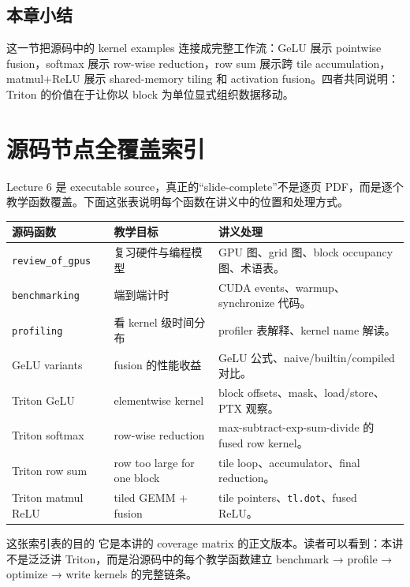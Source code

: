 \documentclass[a4paper]{article}
\begin{document}
\subsection{本章小结}

这一节把源码中的 kernel examples 连接成完整工作流：GeLU 展示 pointwise fusion，softmax 展示 row-wise reduction，row sum 展示跨 tile accumulation，matmul+ReLU 展示 shared-memory tiling 和 activation fusion。四者共同说明：Triton 的价值在于让你以 block 为单位显式组织数据移动。



\section{源码节点全覆盖索引}

Lecture 6 是 executable source，真正的“slide-complete”不是逐页 PDF，而是逐个教学函数覆盖。下面这张表说明每个函数在讲义中的位置和处理方式。

\begin{longtable}{p{}p{}p{}}
\toprule
\textbf{源码函数} & \textbf{教学目标} & \textbf{讲义处理} \\
\midrule
\texttt{review\_of\_gpus} & 复习硬件与编程模型 & GPU 图、grid 图、block occupancy 图、术语表。 \\
\texttt{benchmarking} & 端到端计时 & CUDA events、warmup、synchronize 代码。 \\
\texttt{profiling} & 看 kernel 级时间分布 & profiler 表解释、kernel name 解读。 \\
GeLU variants & fusion 的性能收益 & GeLU 公式、naive/builtin/compiled 对比。 \\
Triton GeLU & elementwise kernel & block offsets、mask、load/store、PTX 观察。 \\
Triton softmax & row-wise reduction & max-subtract-exp-sum-divide 的 fused row kernel。 \\
Triton row sum & row too large for one block & tile loop、accumulator、final reduction。 \\
Triton matmul ReLU & tiled GEMM + fusion & tile pointers、\texttt{tl.dot}、fused ReLU。 \\
\bottomrule
\end{longtable}

\begin{importantbox}{这张索引表的目的}
它是本讲的 coverage matrix 的正文版本。读者可以看到：本讲不是泛泛讲 Triton，而是沿源码中的每个教学函数建立 benchmark → profile → optimize → write kernels 的完整链条。
\end{importantbox}
\end{document}
